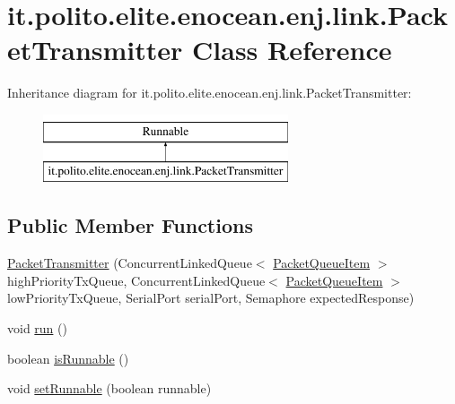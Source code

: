 \hypertarget{classit_1_1polito_1_1elite_1_1enocean_1_1enj_1_1link_1_1_packet_transmitter}{}\section{it.\+polito.\+elite.\+enocean.\+enj.\+link.\+Packet\+Transmitter Class Reference}
\label{classit_1_1polito_1_1elite_1_1enocean_1_1enj_1_1link_1_1_packet_transmitter}
Inheritance diagram for it.\+polito.\+elite.\+enocean.\+enj.\+link.\+Packet\+Transmitter\+:\begin{figure}[H]
\begin{center}
\leavevmode
\includegraphics[height=2.000000cm]{classit_1_1polito_1_1elite_1_1enocean_1_1enj_1_1link_1_1_packet_transmitter}
\end{center}
\end{figure}
\subsection*{Public Member Functions}
\begin{DoxyCompactItemize}
\item 
\hyperlink{classit_1_1polito_1_1elite_1_1enocean_1_1enj_1_1link_1_1_packet_transmitter_a5299ada497832735dcdf6672677af8aa}{Packet\+Transmitter} (Concurrent\+Linked\+Queue$<$ \hyperlink{classit_1_1polito_1_1elite_1_1enocean_1_1enj_1_1link_1_1_packet_queue_item}{Packet\+Queue\+Item} $>$ high\+Priority\+Tx\+Queue, Concurrent\+Linked\+Queue$<$ \hyperlink{classit_1_1polito_1_1elite_1_1enocean_1_1enj_1_1link_1_1_packet_queue_item}{Packet\+Queue\+Item} $>$ low\+Priority\+Tx\+Queue, Serial\+Port serial\+Port, Semaphore expected\+Response)
\item 
void \hyperlink{classit_1_1polito_1_1elite_1_1enocean_1_1enj_1_1link_1_1_packet_transmitter_a98eebf065023d743467f12913be4cd05}{run} ()
\item 
boolean \hyperlink{classit_1_1polito_1_1elite_1_1enocean_1_1enj_1_1link_1_1_packet_transmitter_a9f3565650a328e6f7259a067597c97ac}{is\+Runnable} ()
\item 
void \hyperlink{classit_1_1polito_1_1elite_1_1enocean_1_1enj_1_1link_1_1_packet_transmitter_a6d97c348081325158bd008ac36c67fc6}{set\+Runnable} (boolean runnable)
\end{DoxyCompactItemize}
